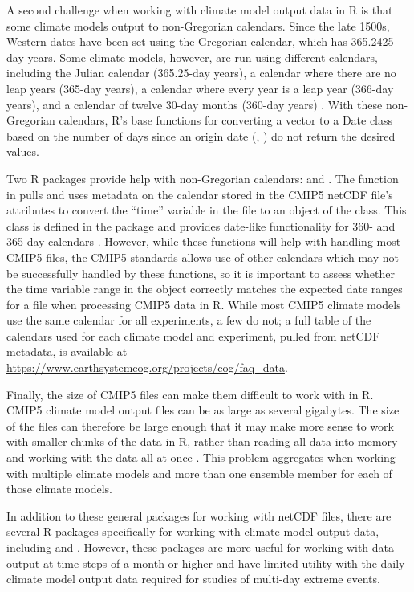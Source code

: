 A second challenge when working with climate model output data in R is
that some climate models output to non-Gregorian calendars. Since the
late 1500s, Western dates have been set using the Gregorian calendar,
which has 365.2425-day years. Some climate models, however, are run
using different calendars, including the Julian calendar (365.25-day
years), a calendar where there are no leap years (365-day years), a
calendar where every year is a leap year (366-day years), and a calendar
of twelve 30-day months (360-day years) \citep{cfconventions}. With
these non-Gregorian calendars, R's base functions for converting a
vector to a Date class based on the number of days since an origin date
(, ) do not return the desired values.

Two R packages provide help with non-Gregorian calendars:
 \citep{PCICt} and 
\citep{ncdf4.helpers}. The  function in
 pulls and uses metadata on the calendar stored in
the CMIP5 netCDF file's attributes to convert the ``time'' variable in
the file to an object of the  class. This class is defined
in the  package and provides date-like functionality for 360-
and 365-day calendars \citep{PCICt}. However, while these functions will
help with handling most CMIP5 files, the CMIP5 standards allows use of
other calendars which may not be successfully handled by these
functions, so it is important to assess whether the time variable range
in the  object correctly matches the expected date ranges
for a file when processing CMIP5 data in R. While most CMIP5 climate
models use the same calendar for all experiments, a few do not; a full
table of the calendars used for each climate model and experiment,
pulled from netCDF metadata, is available at
\url{https://www.earthsystemcog.org/projects/cog/faq_data}.

Finally, the size of CMIP5 files can make them difficult to work with in
R. CMIP5 climate model output files can be as large as several
gigabytes. The size of the files can therefore be large enough that it
may make more sense to work with smaller chunks of the data in R, rather
than reading all data into memory and working with the data all at once
\citep{RCMIP5}. This problem aggregates when working with multiple
climate models and more than one ensemble member for each of those
climate models.

In addition to these general packages for working with netCDF files,
there are several R packages specifically for working with climate model
output data, including  \citep{RCMIP5} and 
\citep{wux}. However, these packages are more useful for working with
data output at time steps of a month or higher and have limited utility
with the daily climate model output data required for studies of
multi-day extreme events.

